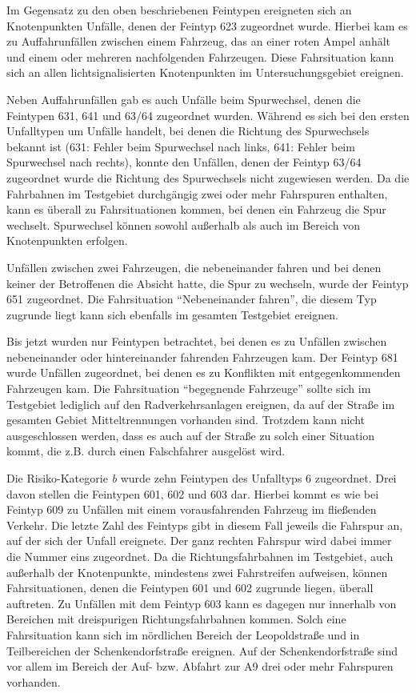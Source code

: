 Im Gegensatz zu den oben beschriebenen Feintypen ereigneten sich an Knotenpunkten Unfälle, denen der Feintyp 623 zugeordnet wurde. Hierbei kam es zu Auffahrunfällen zwischen einem Fahrzeug, das an einer roten Ampel anhält und einem oder mehreren nachfolgenden Fahrzeugen. Diese Fahrsituation kann sich an allen lichtsignalisierten Knotenpunkten im Untersuchungsgebiet ereignen.

Neben Auffahrunfällen gab es auch Unfälle beim Spurwechsel, denen die Feintypen 631, 641 und 63/64 zugeordnet wurden. Während es sich bei den ersten Unfalltypen um Unfälle handelt, bei denen die Richtung des Spurwechsels bekannt ist (631: Fehler beim Spurwechsel nach links, 641: Fehler beim Spurwechsel nach rechts), konnte den Unfällen, denen der Feintyp 63/64 zugeordnet wurde die Richtung des Spurwechsels nicht zugewiesen werden. Da die Fahrbahnen im Testgebiet durchgängig zwei oder mehr Fahrspuren enthalten, kann es überall zu Fahrsituationen kommen, bei denen ein Fahrzeug die Spur wechselt. Spurwechsel können sowohl außerhalb als auch im Bereich von Knotenpunkten erfolgen.

Unfällen zwischen zwei Fahrzeugen, die nebeneinander fahren und bei denen keiner der Betroffenen die Absicht hatte, die Spur zu wechseln, wurde der Feintyp 651 zugeordnet. Die Fahrsituation \enquote{Nebeneinander fahren}, die diesem Typ zugrunde liegt kann sich ebenfalls im gesamten Testgebiet ereignen.

Bis jetzt wurden nur Feintypen betrachtet, bei denen es zu Unfällen zwischen nebeneinander oder hintereinander fahrenden Fahrzeugen kam. Der Feintyp 681 wurde Unfällen zugeordnet, bei denen es zu Konflikten mit entgegenkommenden Fahrzeugen kam. Die Fahrsituation \enquote{begegnende Fahrzeuge} sollte sich im Testgebiet lediglich auf den Radverkehrsanlagen ereignen, da auf der Straße im gesamten Gebiet Mitteltrennungen vorhanden sind. Trotzdem kann nicht ausgeschlossen werden, dass es auch auf der Straße zu solch einer Situation kommt, die z.B. durch einen Falschfahrer ausgelöst wird.

Die Risiko-Kategorie \textit{b} wurde zehn Feintypen des Unfalltyps 6 zugeordnet. Drei davon stellen die Feintypen 601, 602 und 603 dar. Hierbei kommt es wie bei Feintyp 609 zu Unfällen mit einem vorausfahrenden Fahrzeug im fließenden Verkehr. Die letzte Zahl des Feintyps gibt in diesem Fall jeweils die Fahrspur an, auf der sich der Unfall ereignete. Der ganz rechten Fahrspur wird dabei immer die Nummer eins zugeordnet. Da die Richtungsfahrbahnen im Testgebiet, auch außerhalb der Knotenpunkte, mindestens zwei Fahrstreifen aufweisen, können Fahrsituationen, denen die Feintypen 601 und 602 zugrunde liegen, überall auftreten. Zu Unfällen mit dem Feintyp 603 kann es dagegen nur innerhalb von Bereichen mit dreispurigen Richtungsfahrbahnen kommen. Solch eine Fahrsituation kann sich im nördlichen Bereich der Leopoldstraße und in Teilbereichen der Schenkendorfstraße ereignen. Auf der Schenkendorfstraße sind vor allem im Bereich der Auf- bzw. Abfahrt zur A9 drei oder mehr Fahrspuren vorhanden.

